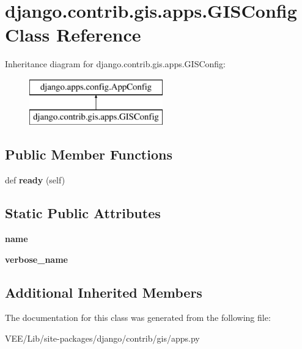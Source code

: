 \hypertarget{classdjango_1_1contrib_1_1gis_1_1apps_1_1_g_i_s_config}{}\section{django.\+contrib.\+gis.\+apps.\+G\+I\+S\+Config Class Reference}
\label{classdjango_1_1contrib_1_1gis_1_1apps_1_1_g_i_s_config}
Inheritance diagram for django.\+contrib.\+gis.\+apps.\+G\+I\+S\+Config\+:\begin{figure}[H]
\begin{center}
\leavevmode
\includegraphics[height=2.000000cm]{classdjango_1_1contrib_1_1gis_1_1apps_1_1_g_i_s_config}
\end{center}
\end{figure}
\subsection*{Public Member Functions}
\begin{DoxyCompactItemize}
\item 
\mbox{\label{classdjango_1_1contrib_1_1gis_1_1apps_1_1_g_i_s_config_ae462a0004f640b0960b314f47c20711e}} 
def {\bfseries ready} (self)
\end{DoxyCompactItemize}
\subsection*{Static Public Attributes}
\begin{DoxyCompactItemize}
\item 
\mbox{\label{classdjango_1_1contrib_1_1gis_1_1apps_1_1_g_i_s_config_a2056e8ad85c115dc29ae45d2e35ca497}} 
{\bfseries name}
\item 
\mbox{\label{classdjango_1_1contrib_1_1gis_1_1apps_1_1_g_i_s_config_ad6b8c5847d3a43b3abd308c84f100d85}} 
{\bfseries verbose\+\_\+name}
\end{DoxyCompactItemize}
\subsection*{Additional Inherited Members}


The documentation for this class was generated from the following file\+:\begin{DoxyCompactItemize}
\item 
V\+E\+E/\+Lib/site-\/packages/django/contrib/gis/apps.\+py\end{DoxyCompactItemize}
